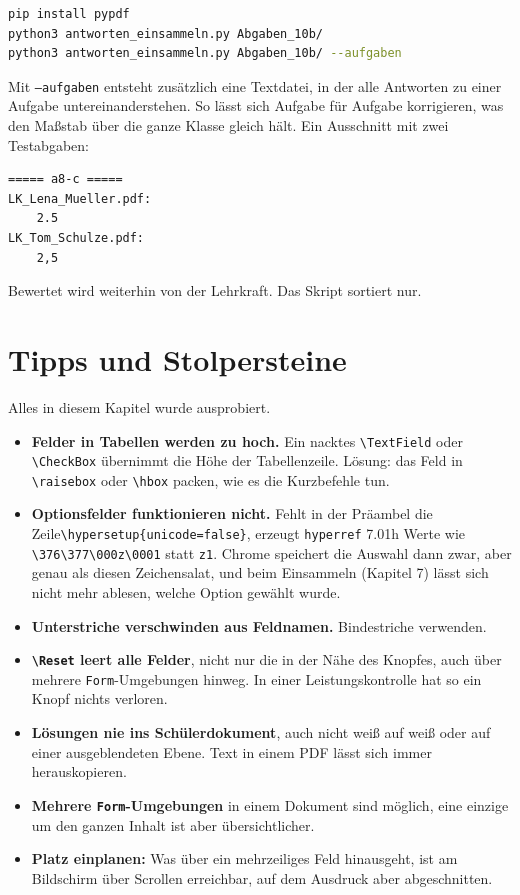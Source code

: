 \begin{Form}
\begin{lstlisting}[style=latex, language=bash]
pip install pypdf
python3 antworten_einsammeln.py Abgaben_10b/
python3 antworten_einsammeln.py Abgaben_10b/ --aufgaben
\end{lstlisting}

Mit \texttt{--aufgaben} entsteht zusätzlich eine Textdatei, in der alle
Antworten zu einer Aufgabe untereinanderstehen. So lässt sich Aufgabe für
Aufgabe korrigieren, was den Maßstab über die ganze Klasse gleich hält. Ein
Ausschnitt mit zwei Testabgaben:

\begin{lstlisting}[style=latex, language={}]
===== a8-c =====
LK_Lena_Mueller.pdf:
    2.5
LK_Tom_Schulze.pdf:
    2,5
\end{lstlisting}

Bewertet wird weiterhin von der Lehrkraft. Das Skript sortiert nur.



\section{Tipps und Stolpersteine}

Alles in diesem Kapitel wurde ausprobiert.

\begin{itemize}
	\item \textbf{Felder in Tabellen werden zu hoch.} Ein nacktes
	\verb|\TextField| oder \verb|\CheckBox| übernimmt die Höhe der
	Tabellenzeile. Lösung: das Feld in \verb|\raisebox| oder \verb|\hbox|
	packen, wie es die Kurzbefehle tun.
	\item \textbf{Optionsfelder funktionieren nicht.} Fehlt in der Präambel
	die Zeile\newline \verb|\hypersetup{unicode=false}|, erzeugt \texttt{hyperref} 7.01h
	Werte wie \verb|\376\377\000z\0001| statt \texttt{z1}. Chrome speichert die
	Auswahl dann zwar, aber genau als diesen Zeichensalat, und beim Einsammeln
	(Kapitel 7) lässt sich nicht mehr ablesen, welche Option gewählt wurde.
	\item \textbf{Unterstriche verschwinden aus Feldnamen.} Bindestriche
	verwenden.
	\item \textbf{\texttt{\textbackslash Reset} leert alle Felder}, nicht nur
	die in der Nähe des Knopfes, auch über mehrere \texttt{Form}-Umgebungen
	hinweg. In einer Leistungskontrolle hat so ein Knopf nichts verloren.
	\item \textbf{Lösungen nie ins Schülerdokument}, auch nicht weiß auf weiß
	oder auf einer ausgeblendeten Ebene. Text in einem PDF lässt sich immer
	herauskopieren.
	\item \textbf{Mehrere \texttt{Form}-Umgebungen} in einem Dokument sind
	möglich, eine einzige um den ganzen Inhalt ist aber übersichtlicher.
	\item \textbf{Platz einplanen:} Was über ein mehrzeiliges Feld hinausgeht,
	ist am Bildschirm über Scrollen erreichbar, auf dem Ausdruck aber
	abgeschnitten.
\end{itemize}




\end{Form}

